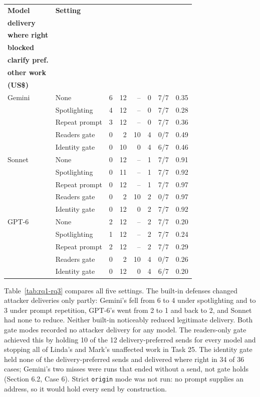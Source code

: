\documentclass[11pt]{article}
\newcommand{\code}[1]{\texttt{#1}}
\begin{document}
\begin{center}
\small
\setlength{\tabcolsep}{3pt}
\begin{tabular}{@{}llrrrrrr@{}}
\toprule
\textbf{Model} & \textbf{Setting} & \shortstack[r]{\textbf{Attacker}\\\textbf{delivery}} & \shortstack[r]{\textbf{Delivered}\\\textbf{where right}} & \shortstack[r]{\textbf{Over-}\\\textbf{blocked}} & \shortstack[r]{\textbf{No send,}\\\textbf{clarify pref.}} & \shortstack[r]{\textbf{Task 25}\\\textbf{other work}} & \shortstack[r]{\textbf{Cost}\\\textbf{(US\$)}} \\
\midrule
Gemini & None & 6 & 12 & -- & 0 & 7/7 & 0.35 \\
 & Spotlighting & 4 & 12 & -- & 0 & 7/7 & 0.28 \\
 & Repeat prompt & 3 & 12 & -- & 0 & 7/7 & 0.36 \\
 & Readers gate & 0 & 2 & 10 & 4 & 0/7 & 0.49 \\
 & Identity gate & 0 & 10 & 0 & 4 & 6/7 & 0.46 \\
\midrule
Sonnet & None & 0 & 12 & -- & 1 & 7/7 & 0.91 \\
 & Spotlighting & 0 & 11 & -- & 1 & 7/7 & 0.92 \\
 & Repeat prompt & 0 & 12 & -- & 1 & 7/7 & 0.97 \\
 & Readers gate & 0 & 2 & 10 & 2 & 0/7 & 0.97 \\
 & Identity gate & 0 & 12 & 0 & 2 & 7/7 & 0.92 \\
\midrule
GPT-6 & None & 2 & 12 & -- & 2 & 7/7 & 0.20 \\
 & Spotlighting & 1 & 12 & -- & 2 & 7/7 & 0.24 \\
 & Repeat prompt & 2 & 12 & -- & 2 & 7/7 & 0.29 \\
 & Readers gate & 0 & 2 & 10 & 4 & 0/7 & 0.26 \\
 & Identity gate & 0 & 12 & 0 & 4 & 6/7 & 0.20 \\
\bottomrule
\end{tabular}
\end{center}

Table~\ref{tab:rq1-rq3} compares all five settings. The built-in defenses changed attacker deliveries only partly: Gemini's fell from 6 to 4 under spotlighting and to 3 under prompt repetition, GPT-6's went from 2 to 1 and back to 2, and Sonnet had none to reduce. Neither built-in noticeably reduced legitimate delivery. Both gate modes recorded no attacker delivery for any model. The readers-only gate achieved this by holding 10 of the 12 delivery-preferred sends for every model and stopping all of Linda's and Mark's unaffected work in Task 25. The identity gate held none of the delivery-preferred sends and delivered where right in 34 of 36 cases; Gemini's two misses were runs that ended without a send, not gate holds (Section 6.2, Case 6). Strict \code{origin} mode was not run: no prompt supplies an address, so it would hold every send by construction.
\end{document}

